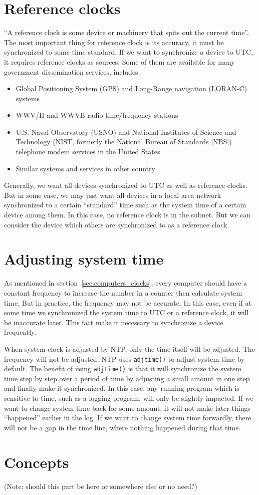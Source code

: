 \section{Reference clocks}%
\label{sec:reference_clocks}
``A reference clock is some device or machinery that spits out the current
time''. 
The most important thing for reference clock is its accuracy, it must be
synchronized to some time standard. If we want to synchronize a device to UTC,
it requires reference clocks as sources. Some of them are available for many
government dissemination services, includes:
\begin{itemize}
    \item Global Positioning System (GPS) and Long-Range navigation (LORAN-C)
        systems
    \item WWV/H and WWVB radio time/frequency stations
    \item U.S. Naval Observatory (USNO) and National Institutes of Science and
        Technology (NIST\null, formerly the National Bureau of Standards [NBS])
        telephone modem services in the United States
    \item Similar systems and services in other country
\end{itemize}
Generally, we want all devices synchronized to UTC as well as reference clocks.
But in some case, we may just want all devices in a local area network
synchronized to a certain ``standard'' time such as the system time of a
certain device among them. In this case, no reference clock is in the subnet.
But we can consider the device which others are synchronized to as a reference
clock. 

\section{Adjusting system time}%
\label{sec:adjusting_system_time}
As mentioned in section~\ref{sec:computers_clocks}, every computer should have
a constant frequency to increase the number in a counter then calculate system
time. But in practice, the frequency may not be accurate. In this case, even if
at some time we synchronized the system time to UTC or a reference clock, it
will be inaccurate later. This fact make it necessary to synchronize a device
frequently.

When system clock is adjusted by NTP\null, only the time itself will be
adjusted.  The frequency will not be adjusted. NTP uses \verb|adjtime()| to
adjust system time by default. The benefit of using \verb|adjtime()| is that it
will synchronize the system time step by step over a period of time by
adjusting a small amount in one step and finally make it synchronized. In this
case, any running program which is sensitive to time, such as a logging
program, will only be slightly impacted. If we want to change system time back
for some amount, it will not make later things ``happened'' earlier in the log.
If we want to change system time forwardly, there will not be a gap in the time
line, where nothing happened during that time.

\section{Concepts}%
\label{sec:concepts}

(Note: should this part be here or somewhere else or no need?)


